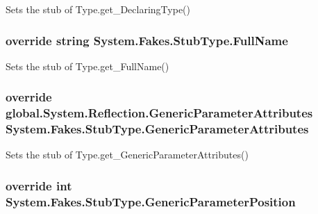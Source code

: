 Sets the stub of Type.\-get\-\_\-\-Declaring\-Type()

\hypertarget{class_system_1_1_fakes_1_1_stub_type_a4f377cf12a88cf9a8fb230f3e43cf954}{
\subsubsection[{Full\-Name}]{\setlength{\rightskip}{0pt plus 5cm}override string System.\-Fakes.\-Stub\-Type.\-Full\-Name\hspace{0.3cm}{\ttfamily [get]}}}\label{class_system_1_1_fakes_1_1_stub_type_a4f377cf12a88cf9a8fb230f3e43cf954}


Sets the stub of Type.\-get\-\_\-\-Full\-Name()

\hypertarget{class_system_1_1_fakes_1_1_stub_type_a00c6dc1cd76453aff11cd80ec2a24275}{
\subsubsection[{Generic\-Parameter\-Attributes}]{\setlength{\rightskip}{0pt plus 5cm}override global.\-System.\-Reflection.\-Generic\-Parameter\-Attributes System.\-Fakes.\-Stub\-Type.\-Generic\-Parameter\-Attributes\hspace{0.3cm}{\ttfamily [get]}}}\label{class_system_1_1_fakes_1_1_stub_type_a00c6dc1cd76453aff11cd80ec2a24275}


Sets the stub of Type.\-get\-\_\-\-Generic\-Parameter\-Attributes()

\hypertarget{class_system_1_1_fakes_1_1_stub_type_acf34896607d1a5294fda63973387d63a}{
\subsubsection[{Generic\-Parameter\-Position}]{\setlength{\rightskip}{0pt plus 5cm}override int System.\-Fakes.\-Stub\-Type.\-Generic\-Parameter\-Position\hspace{0.3cm}{\ttfamily [get]}}}\label{class_system_1_1_fakes_1_1_stub_type_acf34896607d1a5294fda63973387d63a}


